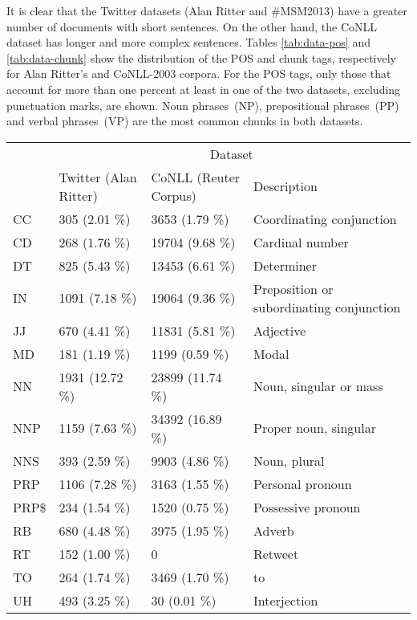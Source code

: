 It is clear that the Twitter datasets (Alan Ritter and \#MSM2013) have a greater number of documents with short sentences. On the other hand, the CoNLL dataset has longer and more complex sentences. Tables \ref{tab:data-pos} and \ref{tab:data-chunk} show the distribution of the POS and chunk tags, respectively for Alan Ritter's and CoNLL-2003 corpora. %
For the POS tags, only those that account for more than one percent at least in one of the two datasets, excluding punctuation marks, are shown.
Noun phrases~(NP), prepositional phrases~(PP) and verbal phrases~(VP) are the most common chunks in both datasets.
\begin{table}[H]
\centering
\footnotesize
\begin{tabular}{|l|l|l|l|}
\hline
\multirow{2}{*}{} & \multicolumn{3}{c|}{Dataset} \\ \cline{2-4} 
 & Twitter (Alan Ritter) & CoNLL (Reuter Corpus) & Description\\ \hline
CC & 305 (2.01 \%) & 3653 (1.79 \%) & Coordinating conjunction \\ \hline
CD & 268 (1.76 \%) & 19704 (9.68 \%) & Cardinal number \\ \hline
DT & 825 (5.43 \%) & 13453 (6.61 \%) & Determiner\\ \hline
IN & 1091 (7.18 \%) & 19064 (9.36 \%) & Preposition or subordinating conjunction\\ \hline
JJ & 670 (4.41 \%) & 11831 (5.81 \%) & Adjective\\ \hline
MD & 181 (1.19 \%) & 1199 (0.59 \%) & Modal\\ \hline
NN & 1931 (12.72 \%) & 23899 (11.74 \%) & Noun, singular or mass \\ \hline
NNP & 1159 (7.63 \%) & 34392 (16.89 \%) & Proper noun, singular  \\ \hline
NNS & 393 (2.59 \%) & 9903 (4.86 \%) & Noun, plural  \\ \hline
PRP & 1106 (7.28 \%) & 3163 (1.55 \%) & Personal pronoun \\ \hline
PRP\$ & 234  (1.54 \%) & 1520 (0.75 \%) & Possessive pronoun \\ \hline
RB & 680 (4.48 \%) & 3975 (1.95 \%) & Adverb\\ \hline
RT & 152 (1.00 \%) & 0 & Retweet \\ \hline
TO & 264 (1.74 \%) & 3469 (1.70 \%) & to\\ \hline
UH & 493 (3.25 \%) & 30 (0.01 \%) & Interjection\\ \hline

\end{tabular}
\end{table}
